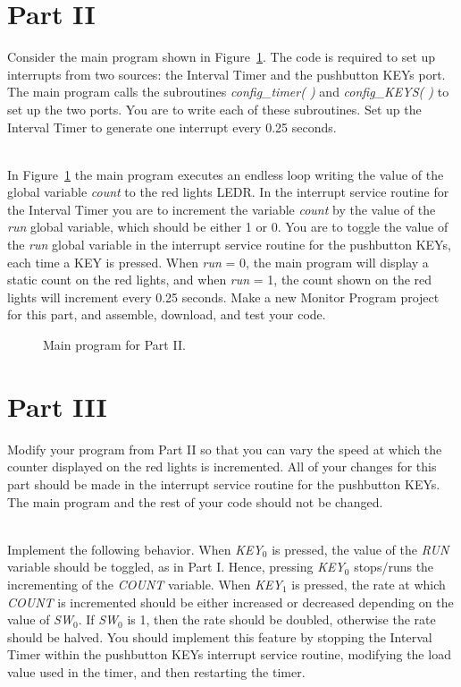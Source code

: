 \documentclass[epsfig,10pt,fullpage]{article}
\begin{document}
\newpage
\section*{ Part II}
Consider the main program shown in Figure~\ref{fig:code2}. The code is required to set up 
interrupts from two sources: the Interval Timer and the pushbutton KEYs port. The main program 
calls the subroutines {\it config\_timer( )} and {\it config\_KEYS( )} to set up the two ports. 
You are to write each of these subroutines. Set up the Interval Timer to generate one interrupt
every 0.25 seconds.

~\\
In Figure~\ref{fig:code2} the main program executes an endless loop writing the value of
the global variable {\it count} to the red lights LEDR.  In the interrupt service routine for 
the Interval Timer you are to increment the variable {\it count} 
by the value of the {\it run} global variable, 
which should be either 1 or 0.  You are to toggle the value of the {\it run} global variable 
in the interrupt service routine for the pushbutton KEYs, each time a KEY is pressed.
When {\it run} = 0, the main program will display a static count on the red lights,
and when {\it run} = 1, the count shown on the red lights will increment every 0.25 seconds.
Make a new Monitor Program project for this part, and assemble, download, and test your
code.

\begin{figure}[H]
\begin{center}

\end{center}
\vspace{-0.5cm}\caption{Main program for Part II.}
\label{fig:code2}
\end{figure}

\newpage
\section*{ Part III}
Modify your program from Part II so that you can vary the speed at which the counter
displayed on the red lights is incremented. All of your changes for this part should be made
in the interrupt service routine for the pushbutton KEYs. The main program and the rest of
your code should not be changed.

~\\
Implement the following behavior. When {\it KEY}$_0$ is pressed, the value of the {\it RUN}
variable should be toggled, as in Part I. Hence, pressing {\it KEY}$_0$ stops/runs
the incrementing of the {\it COUNT} variable. When {\it KEY}$_1$ is pressed, the rate at which
{\it COUNT} is incremented should be either increased or decreased depending on the value of {\it SW}$_0$.
If {\it SW}$_0$ is 1, then the rate should be doubled, otherwise the
rate should be halved. You should implement this feature by stopping the Interval Timer within
the pushbutton KEYs interrupt service routine, modifying the load value used in the
timer, and then restarting the timer.
\end{document}

